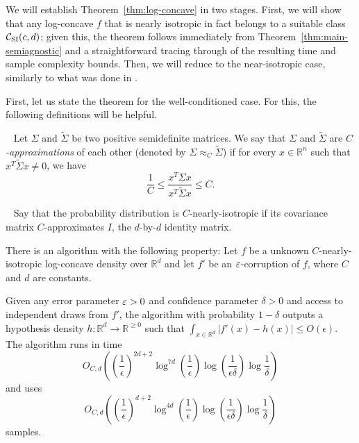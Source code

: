 We will establish Theorem~\ref{thm:log-concave} in two stages.
First, we will show that  any log-concave $f$ that is nearly
isotropic in fact belongs to a suitable class ${\mathcal C}_{\mathrm{SI}}(c,d)$; given
this, the theorem follows immediately from
Theorem~\ref{thm:main-semiagnostic} and a straightforward tracing
through of the resulting time and sample complexity bounds.  Then,
we will reduce to the near-isotropic case, similarly to what was
done in \citep{LovaszVempala07,balcan2013active}.

First, let us state the theorem for the well-conditioned case.  For this, the following definitions
will be helpful.
\begin{definition}~\label{def:PSD-aprx}
 Let $\Sigma$ and $\tilde{\Sigma}$ be two positive semidefinite matrices.  We say that $\Sigma$ and $\tilde{\Sigma}$ are 
 \emph{$C$-approximations}
of each other (denoted by $\Sigma \approx_C \tilde{\Sigma}$) if for every $x \in \mathbb{R}^n$ such that $x^T \widetilde{\Sigma} x \neq 0$, we have
$$
\frac1C \le \frac{x^T \Sigma x}{x^T \widetilde{\Sigma} x} \le C. 
$$
\end{definition}
\begin{definition}~\label{def:C.round}
Say that the probability distribution is $C$-nearly-isotropic if
its covariance matrix $C$-approximates $I$, the $d$-by-$d$ identity matrix.
\end{definition}

\begin{theorem} \label{thm:log-concave.round}
There is an algorithm with the following property:  Let $f$ be a unknown $C$-nearly-isotropic log-concave density over $\mathbb{R}^d$ and let $f'$ be an $\varepsilon$-corruption of $f$, where $C$ and $d$ are constants.

Given any error parameter $\varepsilon>0$ and confidence parameter $\delta > 0$ and access to independent draws from $f'$, the algorithm with probability $1-\delta$ outputs a hypothesis density ${h}:\mathbb{R}^d \rightarrow \mathbb{R}^{\geq 0}$ such that $\int_{x \in \mathbb{R}^d} |f'(x) - {h}(x)| \le O(\epsilon)$.  
The algorithm runs in time 
\[
O_{C,d}
\left(
          \left( \frac{1}{\epsilon} \right)^{2 d + 2}
          \log^{7 d} \left( \frac{1}{\epsilon}  \right) 
          \log \left( \frac{1}{\epsilon \delta}
  \right) \log \frac{1}{\delta}
\right)
\] 
and uses 
\[
O_{C,d}
\left( 
          \left( \frac{1}{\epsilon} \right)^{d+2}
          \log^{4d} \left( \frac{1}{\epsilon} \right)
          \log \left( \frac{1}{\epsilon \delta} 
 \right) \log \frac{1}{\delta}
\right)
\] samples.  
\end{theorem}

